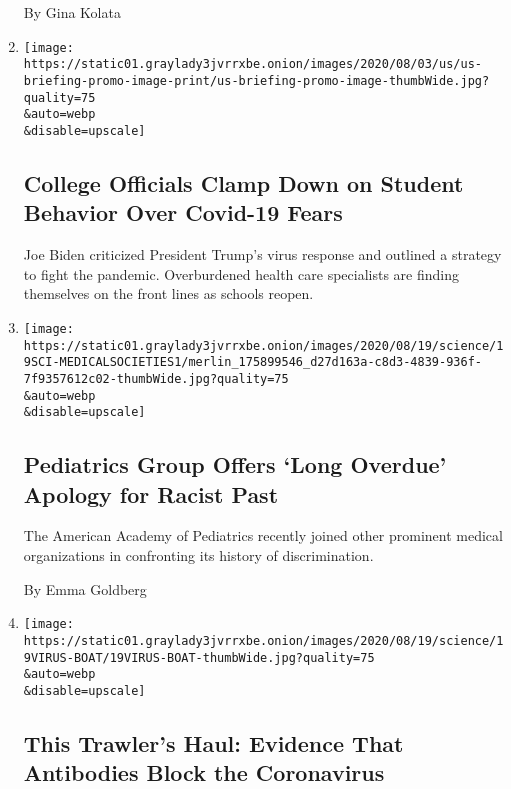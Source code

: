 \begin{enumerate}
  By Gina Kolata
\item
  \href{/2020/08/20/world/coronavirus-covid.html}{}

  \texttt{[image: https://static01.graylady3jvrrxbe.onion/images/2020/08/03/us/us-briefing-promo-image-print/us-briefing-promo-image-thumbWide.jpg?quality=75\\\&auto=webp\\\&disable=upscale]}

  \hypertarget{college-officials-clamp-down-on-student-behavior-over-covid-19-fears}{%
  \subsection{College Officials Clamp Down on Student Behavior Over
  Covid-19
  Fears}\label{college-officials-clamp-down-on-student-behavior-over-covid-19-fears}}

  Joe Biden criticized President Trump's virus response and outlined a
  strategy to fight the pandemic. Overburdened health care specialists
  are finding themselves on the front lines as schools reopen.
\item
  \href{/2020/08/20/health/pediatrics-medicine-racial-discrimination.html}{}

  \texttt{[image: https://static01.graylady3jvrrxbe.onion/images/2020/08/19/science/19SCI-MEDICALSOCIETIES1/merlin\_175899546\_d27d163a-c8d3-4839-936f-7f9357612c02-thumbWide.jpg?quality=75\\\&auto=webp\\\&disable=upscale]}

  \hypertarget{pediatrics-group-offers-long-overdue-apology-for-racist-past}{%
  \subsection{Pediatrics Group Offers `Long Overdue' Apology for Racist
  Past}\label{pediatrics-group-offers-long-overdue-apology-for-racist-past}}

  The American Academy of Pediatrics recently joined other prominent
  medical organizations in confronting its history of discrimination.

  By Emma Goldberg
\item
  \href{/2020/08/19/health/coronavirus-fishing-boat.html}{}

  \texttt{[image: https://static01.graylady3jvrrxbe.onion/images/2020/08/19/science/19VIRUS-BOAT/19VIRUS-BOAT-thumbWide.jpg?quality=75\\\&auto=webp\\\&disable=upscale]}

  \hypertarget{this-trawlers-haul-evidence-that-antibodies-block-the-coronavirus}{%
  \subsection{This Trawler's Haul: Evidence That Antibodies Block the
  Coronavirus}\label{this-trawlers-haul-evidence-that-antibodies-block-the-coronavirus}}


\end{enumerate}
